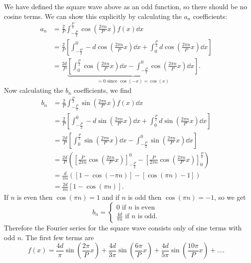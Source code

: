 \documentclass[../classical_mechanics.tex]{subfiles}
\begin{document}
\begin{example}
                We have defined the square wave above as an odd function, so there should be no cosine terms.
                We can show this explicitly by calculating the $a_n$ coefficients:
                \begin{align}
                    a_n&=\frac{2}{P}\int_{-\frac{P}{2}}^{\frac{P}{2}}\cos\left(\frac{2\pi n}{P}x\right)f(x)\dd{x}\\
                    &=\frac{2}{P}\left[\int_{-\frac{P}{2}}^0 -d\cos\left(\frac{2\pi n}{P}x\right)\dd{x}+\int_0^{\frac{P}{2}}d\cos\left(\frac{2\pi n}{P}x\right)\dd{x}\right]\\
                    &=\frac{2d}{P}\underbrace{\left[\int_0^{\frac{P}{2}}\cos\left(\frac{2\pi n}{P}x\right)\dd{x}-\int_{-\frac{P}{2}}^0\cos\left(\frac{2\pi n}{P}x\right)\dd{x}\right]}_{=0\text{ since }\cos(-x)=\cos(x)}.
                \end{align}
                Now calculating the $b_n$ coefficients, we find
                \begin{align}
                    b_n&=\frac{2}{P}\int_{-\frac{P}{2}}^{\frac{P}{2}}\sin\left(\frac{2\pi n}{P}x\right)f(x)\dd{x}\\
                    &=\frac{2}{P}\left[\int_{-\frac{P}{2}}^0 -d\sin\left(\frac{2\pi n}{P}x\right)\dd{x}+\int_0^{\frac{P}{2}}d\sin\left(\frac{2\pi n}{P}x\right)\dd{x}\right]\\
                    &=\frac{2d}{P}\left[\int_0^{\frac{P}{2}}\sin\left(\frac{2\pi n}{P}x\right)\dd{x}-\int_{-\frac{P}{2}}^0\sin\left(\frac{2\pi n}{P}x\right)\dd{x}\right]\\
                    &=\frac{2d}{P}\left(\left[\frac{P}{2\pi n}\cos\left(\frac{2\pi n}{P}x\right)\right]_{-\frac{P}{2}}^0-\left[\frac{P}{2\pi n}\cos\left(\frac{2\pi n}{P}x\right)\right]_0^{\frac{P}{2}}\right)\\
                    &=\frac{d}{\pi n}([1-\cos(-\pi n)]-[\cos(\pi n)-1])\\
                    &=\frac{2d}{\pi n}[1-\cos(\pi n)].
                \end{align}
                If $n$ is even then $\cos(\pi n)=1$ and if $n$ is odd then $\cos(\pi n)=-1$, so we get
                \begin{equation}
                    b_n=\begin{cases}
                        0\text{ if $n$ is even}\\
                        \frac{4d}{\pi n}\text{ if $n$ is odd.}
                    \end{cases}
                \end{equation}
                Therefore the Fourier series for the square wave consists only of sine terms with odd $n$.
                The first few terms are
                \begin{equation}
                    f(x)=\frac{4d}{\pi}\sin\left(\frac{2\pi}{P}x\right)+\frac{4d}{3\pi}\sin\left(\frac{6\pi}{P}x\right)+\frac{4d}{5\pi}\sin\left(\frac{10\pi}{P}x\right)+\dots.
                \end{equation}
            \end{example}
\end{document}
